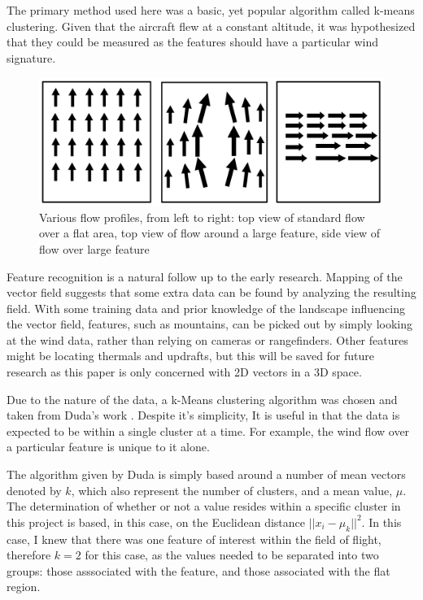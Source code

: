 \documentclass[12pt]{report}
\begin{document}
The primary method used here was a basic, yet popular algorithm called k-means clustering. Given that the aircraft flew at a constant altitude, it was hypothesized that they could be measured as the features should have a particular wind signature.
\begin{figure}[!ht]
	\centering
	\includegraphics[scale=0.25]{flow_views.png}
	\caption{Various flow profiles, from left to right: top view of standard flow over a flat area, top view of flow around a large feature, side view of flow over large feature \cite{Vogt}}
	\label{fig:flow_views}
\end{figure}
Feature recognition is a natural follow up to the early research. Mapping of the vector field suggests that some extra data can be found by analyzing the resulting field. With some training data and prior knowledge of the landscape influencing the vector field, features, such as mountains, can be picked out by simply looking at the wind data, rather than relying on cameras or rangefinders. Other features might be locating thermals and updrafts, but this will be saved for future research as this paper is only concerned with 2D vectors in a 3D space.

Due to the nature of the data, a k-Means clustering algorithm was chosen and taken from Duda's work \cite{Duda01}. Despite it's simplicity, It is useful in that the data is expected to be within a single cluster at a time. For example, the wind flow over a particular feature is unique to it alone.

The algorithm given by Duda is simply based around a number of mean vectors denoted by $k$, which also represent the number of clusters, and a mean value, $\mu$. The determination of whether or not a value resides within a specific cluster in this project is based, in this case, on the Euclidean distance $||x_i-\mu_k||^2$. In this case, I knew that there was one feature of interest within the field of flight, therefore $k=2$ for this case, as the values needed to be separated into two groups: those asssociated with the feature, and those associated with the flat region. 
\end{document}
